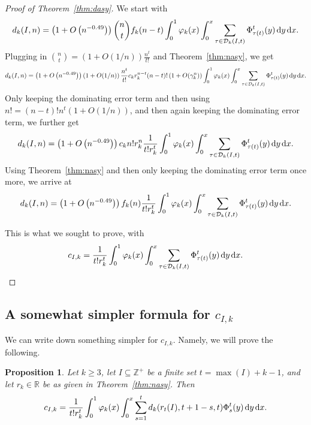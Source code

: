 \documentclass{amsart}
\newtheorem{proposition}[theorem]{Proposition}
\theoremstyle{definition}
\begin{document}
\begin{proof}[Proof of Theorem~\ref{thm:dasy}] 
We start with \[d_k(I,n)=\left(1+O\left(n^{-0.49}\right)\right)\binom{n}{t}f_k(n-t)\int_0^1\varphi_k(x)\int_{0}^{x}\sum_{\tau\in \mathcal{D}_k(I,t)}\Phi_{\tau(t)}^t(y)\hspace{0.5mm}\mathrm{d}y\hspace{0.5mm}\mathrm{d}x.\]
Plugging in $\binom{n}{t}=(1+O(1/n))\frac{n^t}{t!}$ and Theorem~\ref{thm:nasy}, we get
\[d_k(I,n)=\left(1+O\left(n^{-0.49}\right)\right)\left(1+O(1/n)\right)\frac{n^t}{t!}c_k r_k^{n-t}(n-t)!\left(1+O(\gamma_k^n)\right)\int_0^1\varphi_k(x)\int_{0}^{x}\sum_{\tau\in \mathcal{D}_k(I,t)}\Phi_{\tau(t)}^t(y)\hspace{0.5mm}\mathrm{d}y\hspace{0.5mm}\mathrm{d}x.\]
Only keeping the dominating error term and then using $n!=(n-t)!n^t\left(1+O(1/n)\right)$, and then again keeping the dominating error term, we further get
\[d_k(I,n)=\left(1+O\left(n^{-0.49}\right)\right)c_k n!r_k^{n}\frac{1}{t! r_k^t}\int_0^1\varphi_k(x)\int_{0}^{x}\sum_{\tau\in \mathcal{D}_k(I,t)}\Phi_{\tau(t)}^t(y)\hspace{0.5mm}\mathrm{d}y\hspace{0.5mm}\mathrm{d}x.\]
Using Theorem~\ref{thm:nasy} and then only keeping the dominating error term once more, we arrive at
\[d_k(I,n)=\left(1+O\left(n^{-0.49}\right)\right)f_k(n)\frac{1}{t! r_k^t}\int_0^1\varphi_k(x)\int_{0}^{x}\sum_{\tau\in \mathcal{D}_k(I,t)}\Phi_{\tau(t)}^t(y)\hspace{0.5mm}\mathrm{d}y\hspace{0.5mm}\mathrm{d}x.\]

This is what we sought to prove, with
\[c_{I,k}=\frac{1}{t! r_k^t}\int_0^1\varphi_k(x)\int_{0}^{x}\sum_{\tau\in \mathcal{D}_k(I,t)}\Phi_{\tau(t)}^t(y)\hspace{0.5mm}\mathrm{d}y\hspace{0.5mm}\mathrm{d}x.\]

\end{proof}



\subsection{A somewhat simpler formula for $c_{I,k}$}
We can write down something simpler for $c_{I,k}$. Namely, we will prove the following.
\begin{proposition}\label{prop:niceform}
Let $k\geq 3$, let $I\subseteq \mathbb{Z}^+$ be a finite set $t=\max(I)+k-1$, and let $r_k\in \mathbb{R}$ be as given in Theorem~\ref{thm:nasy}. Then
\[c_{I,k}=\frac{1}{t! r_k^t}\int_0^1\varphi_k(x)\int_{0}^{x}\sum_{s=1}^t d_k(r_t(I),t+1-s,t)\Phi_{s}^t(y)\hspace{0.5mm}\mathrm{d}y\hspace{0.5mm}\mathrm{d}x.\]
\end{proposition}
\end{document}

